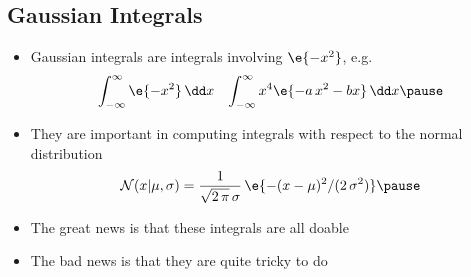 \Outline %

\begin{slide}
\section{Gaussian Integrals}

\begin{PauseHighLight}
  \begin{itemize}
  \item Gaussian integrals  are integrals involving $\e{-x^2}$, e.g.
    \begin{align*}
      \int_{-\infty}^\infty \e{-x^2} \, \dd x
      &&
         \int_{-\infty}^\infty x^4 \e{-a\,x^2 - b x}\, \dd x\pause
    \end{align*}
  \item They are important in computing integrals with respect to the
    normal distribution
    \begin{align*}
      \mathcal{N}(x|\mu, \sigma) = \frac{1}{\sqrt{2\, \pi} \, \sigma} \,\e{-(x-\mu)^2/(2\,\sigma^2)}\pause
    \end{align*}
  \item The great news is that these integrals are all doable\pauseb
  \item The bad news is that they are quite tricky to do\pauseb
  \end{itemize}
\end{PauseHighLight}

\end{slide}


